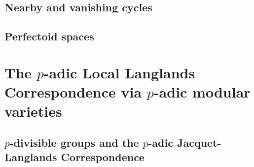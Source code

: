         \begin{appendices}
            \chapter{Nearby and vanishing cycles}
                \begin{abstract}
                    
                \end{abstract}
                
                \minitoc
                
                
                
                
        
            \chapter{Perfectoid spaces}
                \begin{abstract}
                    
                \end{abstract}
                
                \minitoc
                
                
                
                
        \end{appendices}

    \part{The \texorpdfstring{$p$}{}-adic Local Langlands Correspondence via \texorpdfstring{$p$}{}-adic modular varieties}
        \chapter{\texorpdfstring{$p$}{}-divisible groups and the \texorpdfstring{$p$}{}-adic Jacquet-Langlands Correspondence}
            \begin{abstract}
                
            \end{abstract}
            
            
            
